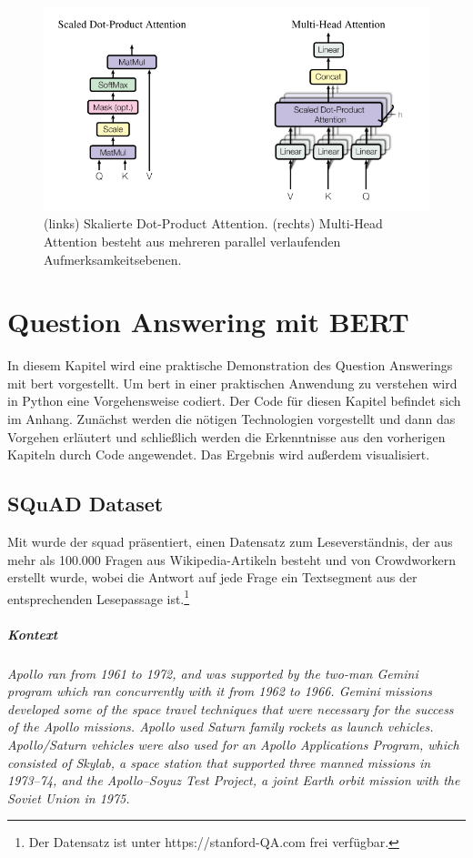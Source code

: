 \documentclass[
        ngerman,
        paper=a4,
        numbers=noendperiod,
]{scrreprt}
\begin{document}
\begin{figure}[H]
    \centering\includegraphics[width=0.8\linewidth]{images/atten.png}
    \caption[Aufmerksamkeits-Mechanismus]{(links) Skalierte Dot-Product Attention. (rechts) Multi-Head Attention besteht aus mehreren parallel verlaufenden Aufmerksamkeitsebenen. \citep{VaswaniAttentionNeed}}
    \label{fig:atten}
\end{figure}





\chapter{Question Answering mit BERT}
In diesem Kapitel wird eine praktische Demonstration des Question Answerings mit \ac{bert} vorgestellt. Um \ac{bert} in einer praktischen Anwendung zu verstehen wird in Python eine Vorgehensweise codiert. Der Code für diesen Kapitel befindet sich im Anhang. Zunächst werden die nötigen Technologien vorgestellt und dann das Vorgehen erläutert und schließlich werden die Erkenntnisse aus den vorherigen Kapiteln durch Code angewendet. Das Ergebnis wird außerdem visualisiert.
\section{SQuAD Dataset}
Mit \citep{RajpurkarSQuAD:Text} wurde der \ac{squad} präsentiert, einen Datensatz zum Leseverständnis, der aus mehr als 100.000 Fragen aus Wikipedia-Artikeln besteht und von Crowdworkern erstellt wurde, wobei die Antwort auf jede Frage ein Textsegment aus der entsprechenden Lesepassage ist.\footnote{Der Datensatz ist unter https://stanford-QA.com frei verfügbar.} 


\paragraph{Kontext}\textit{Apollo ran from 1961 to 1972, and was supported by the two-man Gemini program which ran concurrently with it from 1962 to 1966. Gemini missions developed some of the space travel techniques that were necessary for the success of the Apollo missions. Apollo used Saturn family rockets as launch vehicles. Apollo/Saturn vehicles were also used for an Apollo Applications Program, which consisted of Skylab, a space station that supported three manned missions in 1973–74, and the Apollo–Soyuz Test Project, a joint Earth orbit mission with the Soviet Union in 1975.}
\end{document}
